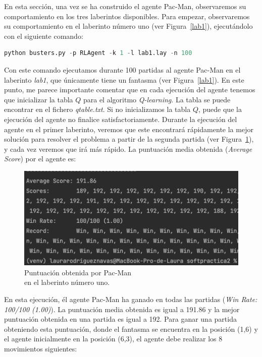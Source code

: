 \documentclass[11pt]{exam}
\begin{document}
En esta sección, una vez se ha construido el agente Pac-Man, observaremos su comportamiento en los tres laberintos disponibles. Para empezar, observaremos su comportamiento en el laberinto número uno (ver Figura~\ref{lab1}), ejecutándolo con el siguiente comando:
\vspace*{2mm}

\begin{lstlisting}[language=python, basicstyle=\footnotesize]
python busters.py -p RLAgent -k 1 -l lab1.lay -n 100
\end{lstlisting}

Con este comando ejecutamos durante 100 partidas al agente Pac-Man en el laberinto \textit{lab1}, que únicamente tiene un fantasma (ver Figura~\ref{lab1}). En este punto, me parece importante comentar que en cada ejecución del agente tenemos que inicializar la tabla $Q$ para el algoritmo \textit{Q-learning}. La tabla se puede encontrar en el fichero \textit{qtable.txt}. Si no inicializamos la tabla $Q$, puede que la ejecución del agente no finalice satisfactoriamente. Durante la ejecución del agente en el primer laberinto, veremos que este encontrará rápidamente la mejor solución para resolver el problema a partir de la segunda partida (ver Figura~\ref{result_lab1}), y cada vez veremos que irá más rápido. La puntuación media obtenida (\textit{Average Score}) por el agente es:
\vspace*{2mm}

\begin{figure}[H]
	\centering
	\includegraphics[scale=0.65]{result_lab1}
	\caption{Puntuación obtenida por Pac-Man \\ en el laberinto número uno.}
	\label{result_lab1}
\end{figure}

En esta ejecución, él agente Pac-Man ha ganado en todas las partidas (\textit{Win Rate: 100/100 (1.00)}). La puntuación media obtenida es igual a 191.86 y la mejor puntuación obtenida en una partida es igual a 192. Para ganar una partida obteniendo esta puntuación, donde el fantasma se encuentra en la posición (1,6) y el agente inicialmente en la posición (6,3), el agente debe realizar los 8 movimientos siguientes:
\vspace*{2mm}
\end{document}
